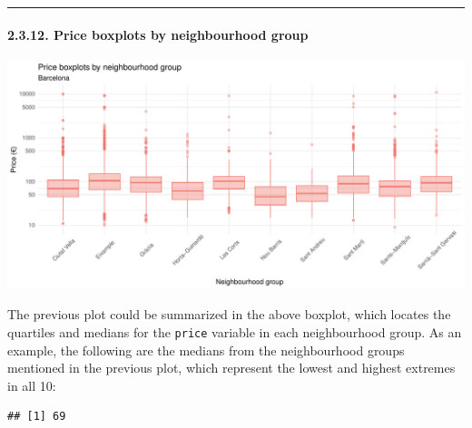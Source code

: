 \documentclass[
]{article}
\newenvironment{Shaded}{\begin{snugshade}}{\end{snugshade}}
\newcommand{\AttributeTok}[1]{\textcolor[rgb]{0.13,0.29,0.53}{#1}}
\newcommand{\ConstantTok}[1]{\textcolor[rgb]{0.56,0.35,0.01}{#1}}
\newcommand{\FunctionTok}[1]{\textcolor[rgb]{0.13,0.29,0.53}{\textbf{#1}}}
\newcommand{\NormalTok}[1]{#1}
\newcommand{\SpecialCharTok}[1]{\textcolor[rgb]{0.81,0.36,0.00}{\textbf{#1}}}
\newcommand{\StringTok}[1]{\textcolor[rgb]{0.31,0.60,0.02}{#1}}
\begin{document}
\begin{center}\rule{0.5\linewidth}{0.5pt}\end{center}

\hypertarget{price-boxplots-by-neighbourhood-group}{%
\paragraph{2.3.12. Price boxplots by neighbourhood
group}\label{price-boxplots-by-neighbourhood-group}}

\begin{center}\includegraphics{Barcelona-AirBnB-Insights_files/figure-latex/plot12-1} \end{center}

The previous plot could be summarized in the above boxplot, which
locates the quartiles and medians for the \texttt{price} variable in
each neighbourhood group. As an example, the following are the medians
from the neighbourhood groups mentioned in the previous plot, which
represent the lowest and highest extremes in all 10:

\begin{Shaded}
\end{Shaded}

\begin{verbatim}
## [1] 69
\end{verbatim}

\begin{Shaded}
\end{Shaded}
\end{document}

